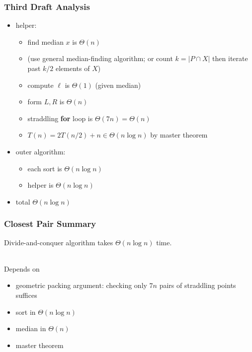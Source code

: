 \documentclass{beamer}
\newcommand{\stanza}{ \\~\ }
\begin{document}
\begin{frame} \frametitle{Third Draft Analysis}
\begin{itemize}
  \item helper:
    \begin{itemize}
      \item find median $x$ is $\Theta(n)$
      \item (use general median-finding algorithm; or count $k=|P \cap X|$
        then iterate past $k/2$ elements of $X$)
      \item compute $\ell$ is $\Theta(1)$ (given median)
      \item form $L, R$ is $\Theta(n)$
      \item straddling \textbf{for} loop is $\Theta(7n) = \Theta(n)$
      \item $T(n) = 2 T(n/2) + n \in \Theta(n \log n)$ by master theorem
    \end{itemize}
  \item outer algorithm:
    \begin{itemize}
      \item each sort is $\Theta(n \log n)$
      \item helper is $\Theta(n \log n)$
    \end{itemize}
  \item total $\Theta(n \log n)$
\end{itemize}
\end{frame}

\begin{frame} \frametitle{Closest Pair Summary}
Divide-and-conquer algorithm takes $\Theta(n \log n)$ time. \stanza

Depends on
\begin{itemize}
  \item geometric packing argument: checking only $7n$ pairs of straddling points suffices
  \item sort in $\Theta(n \log n)$
  \item median in $\Theta(n)$
  \item master theorem
\end{itemize}
\end{frame}
\end{document}
